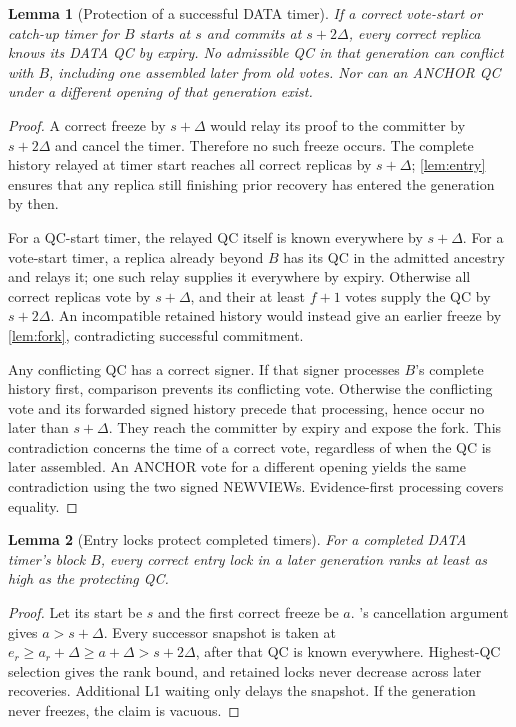 \documentclass[11pt,a4paper]{article}
\newtheorem{lemma}[lemma]{Lemma}
\begin{document}
\begin{lemma}[Protection of a successful DATA timer]
\label{lem:timer}
If a correct vote-start or catch-up timer for $B$ starts at $s$ and
commits at $s+2\Delta$, every correct replica knows its DATA QC by expiry.
No admissible QC in that generation can conflict with $B$, including
one assembled later from old votes. Nor can an ANCHOR QC under a
different opening of that generation exist.
\end{lemma}
\begin{proof}
A correct freeze by $s+\Delta$ would relay its proof to the committer
by $s+2\Delta$ and cancel the timer. Therefore no such freeze occurs.
The complete history relayed at timer start reaches all correct replicas
by $s+\Delta$; \cref{lem:entry} ensures that any replica still finishing
prior recovery has entered the generation by then.

For a QC-start timer, the relayed QC itself is known everywhere by
$s+\Delta$. For a vote-start timer, a replica already beyond $B$ has its
QC in the admitted ancestry and relays it; one such relay supplies it
everywhere by expiry. Otherwise all correct replicas vote by $s+\Delta$,
and their at least $f+1$ votes supply the QC by $s+2\Delta$.
An incompatible retained history would instead give an earlier freeze
by \cref{lem:fork}, contradicting successful commitment.

Any conflicting QC has a correct signer. If that signer processes
$B$'s complete history first, comparison prevents its conflicting vote.
Otherwise the conflicting vote and its forwarded signed history precede
that processing, hence occur no later than $s+\Delta$. They reach the
committer by expiry and expose the fork. This contradiction concerns the
time of a correct vote, regardless of when the QC is later assembled.
An ANCHOR vote for a different opening yields the same contradiction
using the two signed NEWVIEWs. Evidence-first processing covers equality.
\end{proof}

\begin{lemma}[Entry locks protect completed timers]
\label{lem:locks}
For a completed DATA timer's block $B$, every correct entry lock in a
later generation ranks at least as high as the protecting QC.
\end{lemma}
\begin{proof}
Let its start be $s$ and the first correct freeze be $a$.
's cancellation argument gives $a>s+\Delta$.
Every successor snapshot is taken at
$e_r\ge a_r+\Delta\ge a+\Delta>s+2\Delta$, after that QC is known
everywhere. Highest-QC selection gives the rank bound, and retained locks
never decrease across later recoveries. Additional L1 waiting only delays
the snapshot. If the generation never freezes, the claim is vacuous.
\end{proof}
\end{document}
